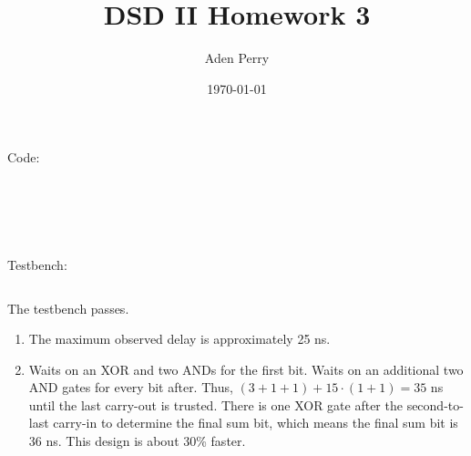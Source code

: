 \documentclass{article}
\title{DSD II Homework 3}
\author{Aden Perry}
\date{\today}
\begin{document}
\maketitle

Code:

\inputminted{vhdl}{hw3.srcs/sources_1/imports/hw3/pg.vhd}
\inputminted{vhdl}{hw3.srcs/sources_1/imports/hw3/sum.vhd}
\inputminted{vhdl}{hw3.srcs/sources_1/imports/hw3/p.vhd}
\inputminted{vhdl}{hw3.srcs/sources_1/imports/hw3/ao.vhd}
\inputminted{vhdl}{hw3.srcs/sources_1/imports/hw3/mux2.vhd}
\inputminted{vhdl}{hw3.srcs/sources_1/imports/hw3/carryskipadd.vhd}

Testbench:

\inputminted{vhdl}{hw3.srcs/sim_1/new/carryskipadd-tb.vhd}

The testbench passes.

\begin{enumerate}
	\item The maximum observed delay is approximately 25 ns.
	\item Waits on an XOR and two ANDs for the first bit. Waits on an
	      additional two AND gates for every bit after. Thus,
          $(3 + 1 + 1) + 15 \cdot (1 + 1) = 35$ ns until the last carry-out is
          trusted. There is one XOR gate after the second-to-last carry-in to
          determine the final sum bit, which means the final sum bit is 36 ns.
          This design is about 30\% faster.
\end{enumerate}
\end{document}
